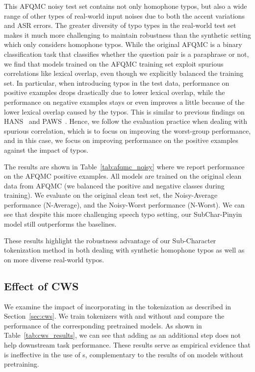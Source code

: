 This AFQMC noisy test set contains not only homophone typos, but also a wide range of other types of real-world input noises due to both the accent variations and ASR errors. The greater diversity of typo types in the real-world test set makes it much more challenging to maintain robustness than the synthetic setting which only considers homophone typos. 
While the original AFQMC is a binary classification task that classifies whether the question pair is a paraphrase or not, we find that models trained on the AFQMC training set exploit spurious correlations like lexical overlap, even though we explicitly balanced the training set. In particular, when introducing typos in the test data, performance on positive examples drops drastically due to lower lexical overlap, while the performance on negative examples stays or even improves a little because of the lower lexical overlap caused by the typos. This is similar to previous findings on HANS~\cite{McCoy2019RightFT} and PAWS~\cite{Zhang2019PAWSPA}. Hence, we follow the evaluation practice when dealing with spurious correlation, which is to focus on improving the worst-group performance, and in this case, we focus on improving performance on the positive examples against the impact of typos. 



The results are shown in Table~\ref{tab:afqmc_noisy} where we report performance on the AFQMC positive examples. All models are trained on the original clean data from AFQMC (we balanced the positive and negative classes during training). We evaluate on the original clean test set, the Noisy-Average performance (N-Average), and the Noisy-Worst performance (N-Worst). We can see that despite this more challenging speech typo setting, our SubChar-Pinyin model still outperforms the baselines. 



These results highlight the robustness advantage of our Sub-Character tokenization method in both dealing with synthetic homophone typos as well as on more diverse real-world typos. 
 




\subsection{Effect of CWS}

 We examine the impact of incorporating \cws{} in the tokenization as described in Section~\ref{sec:cws}.
We train tokenizers with and without \cws{} and compare the performance of the corresponding pretrained models. As shown in Table~\ref{tab:cws_results}, we can see that adding \cws{} as an additional step does not help downstream task performance. These results serve as empirical evidence that \cws{} is ineffective in the use of \plm{}s, complementary to the results of \citet{CWSnecessary} on models without pretraining.


